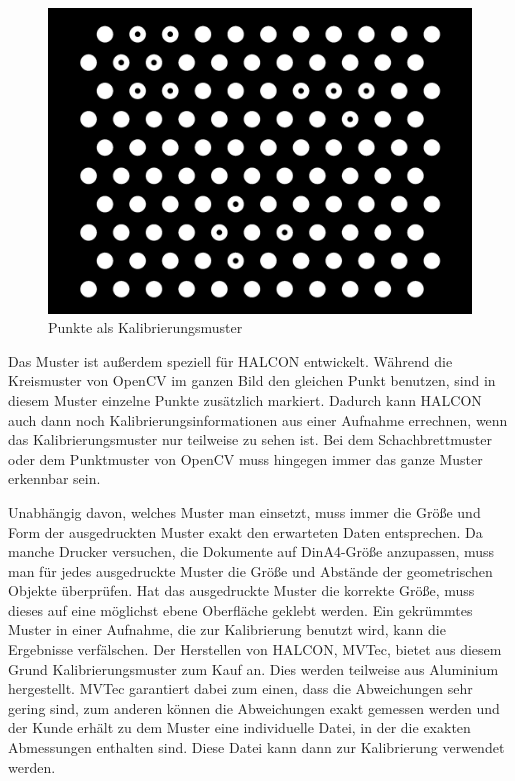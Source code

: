 \begin{figure}[!hbt]
	\centering
	\vspace{1ex}
	\includegraphics[scale=0.2]{../images/caltab_hex_10x11}
	\caption[Punkte als Kalibrierungsmuster]{\label{img:caltab_hex_10x11} Punkte als Kalibrierungsmuster}
	\vspace{1ex}
\end{figure}

Das Muster ist außerdem speziell für HALCON entwickelt. Während die Kreismuster von OpenCV im ganzen Bild den gleichen Punkt benutzen, sind in diesem Muster einzelne Punkte zusätzlich markiert. Dadurch kann HALCON auch dann noch Kalibrierungsinformationen aus einer Aufnahme errechnen, wenn das Kalibrierungsmuster nur teilweise zu sehen ist. Bei dem Schachbrettmuster oder dem Punktmuster von OpenCV muss hingegen immer das ganze Muster erkennbar sein.

Unabhängig davon, welches Muster man einsetzt, muss immer die Größe und Form der ausgedruckten Muster exakt den erwarteten Daten entsprechen. Da manche Drucker versuchen, die Dokumente auf DinA4-Größe anzupassen, muss man für jedes ausgedruckte Muster die Größe und Abstände der geometrischen Objekte überprüfen. Hat das ausgedruckte Muster die korrekte Größe, muss dieses auf eine möglichst ebene Oberfläche geklebt werden. Ein gekrümmtes Muster in einer Aufnahme, die zur Kalibrierung benutzt wird, kann die Ergebnisse verfälschen. Der Herstellen von HALCON, MVTec, bietet aus diesem Grund Kalibrierungsmuster zum Kauf an. Dies werden teilweise aus Aluminium hergestellt. MVTec garantiert dabei zum einen, dass die Abweichungen sehr gering sind, zum anderen können die Abweichungen exakt gemessen werden und der Kunde erhält zu dem Muster eine individuelle Datei, in der die exakten Abmessungen enthalten sind. Diese Datei kann dann zur Kalibrierung verwendet werden.

